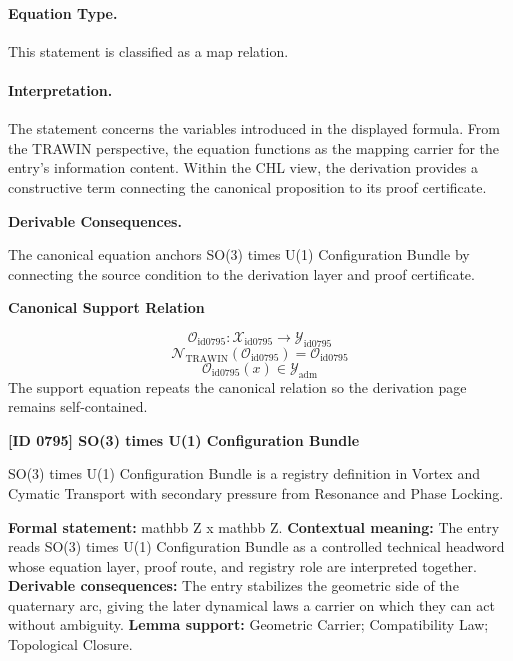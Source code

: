 \paragraph{Equation Type.}
This statement is classified as a map relation.

\paragraph{Interpretation.}
The statement concerns the variables introduced in the displayed formula. From the TRAWIN perspective, the equation functions as the mapping carrier for the entry’s information content. Within the CHL view, the derivation provides a constructive term connecting the canonical proposition to its proof certificate.

\par\vspace{0.35em}
\noindent\textbf{Derivable Consequences.}\quad
\begingroup
\footnotesize
\raggedright
The canonical equation anchors SO(3) times U(1) Configuration Bundle by connecting the source condition to the derivation layer and proof certificate.
\par\endgroup

\noindent\textbf{Canonical Support Relation}\par
\[
\mathcal{O}_{\mathrm{id0795}}:\mathcal{X}_{\mathrm{id0795}}\longrightarrow\mathcal{Y}_{\mathrm{id0795}}
\]
\[
\mathcal{N}_{\mathrm{TRAWIN}}(\mathcal{O}_{\mathrm{id0795}})=\mathcal{O}_{\mathrm{id0795}}
\]
\[
\mathcal{O}_{\mathrm{id0795}}(x)\in\mathcal{Y}_{\mathrm{adm}}
\]
\noindent The support equation repeats the canonical relation so the derivation page remains self-contained.\par

\clearpage
\noindent\textbf{[ID 0795] SO(3) times U(1) Configuration Bundle}\par
\vspace{0.35em}
\begingroup\small
{}
SO(3) times U(1) Configuration Bundle is a registry definition in Vortex and Cymatic Transport with secondary pressure from Resonance and Phase Locking.

\begingroup\footnotesize\setlength{\emergencystretch}{3em}\sloppy
\textbf{Formal statement:} mathbb Z x mathbb Z. \textbf{Contextual meaning:} The entry reads SO(3) times U(1) Configuration Bundle as a controlled technical headword whose equation layer, proof route, and registry role are interpreted together. \textbf{Derivable consequences:} The entry stabilizes the geometric side of the quaternary arc, giving the later dynamical laws a carrier on which they can act without ambiguity. \textbf{Lemma support:} Geometric Carrier; Compatibility Law; Topological Closure.\par
\endgroup

